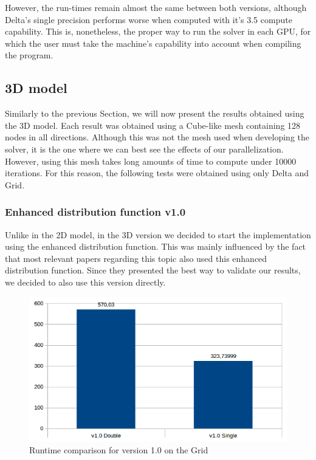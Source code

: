 \documentclass[12pt]{book}
\begin{document}
  However, the run-times remain almost the same between both versions, although Delta's single precision performs worse when computed with it's 3.5 compute capability. This is, nonetheless, the proper way to run the solver in each GPU, for which the user must take the machine's capability into account when compiling the program.
 
\subsection{3D model}
Similarly to the previous Section, we will now present the results obtained using the 3D model. Each result was obtained using a Cube-like mesh containing 128 nodes in all directions. Although this was not the mesh used when developing the solver, it is the one where we can best see the effects of our parallelization. However, using this mesh takes long amounts of time to compute under 10000 iterations. For this reason, the following tests were obtained using only Delta and Grid. 
\subsubsection{Enhanced distribution function v1.0}
Unlike in the 2D model, in the 3D version we decided to start the implementation using the enhanced distribution function. This was mainly influenced by the fact that most relevant papers regarding this topic also used this enhanced distribution function. Since they presented the best way to validate our results, we decided to also use this version directly.

  \begin{figure}[H]
  	\centering
  	\includegraphics[width=\linewidth]{Resources/Images/v13d.png}
  	\caption{Runtime comparison for version 1.0 on the Grid}
  	\label{fig:v13d}
  \end{figure}
 
\end{document}
